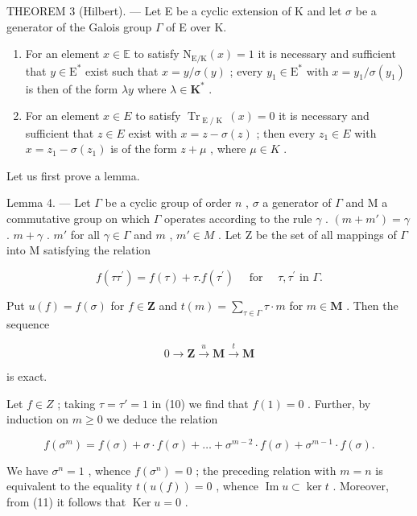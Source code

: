 THEOREM 3 (Hilbert). --- Let E be a cyclic extension of K and let \(\sigma\) be a generator of the Galois group \(\Gamma\) of E over K.

\begin{enumerate}
\def\labelenumi{\alph{enumi})}
\item
  For an element \(x \in \mathbb{E}\) to satisfy \(\mathrm{N}_{\mathrm{E} / \mathrm{K}}(x) = 1\) it is necessary and sufficient that \(y \in \mathrm{E}^*\) exist such that \(x = y / \sigma(y)\) ; every \(y_1 \in \mathrm{E}^*\) with \(x = y_1 / \sigma(y_1)\) is then of the form \(\lambda y\) where \(\lambda \in \mathbf{K}^*\) .
\item
  For an element \(x \in E\) to satisfy \(\operatorname{Tr}_{\operatorname{E}/\operatorname{K}}(x) = 0\) it is necessary and sufficient that \(z \in E\) exist with \(x = z - \sigma(z)\) ; then every \(z_{1} \in E\) with \(x = z_{1} - \sigma(z_{1})\) is of the form \(z + \mu\) , where \(\mu \in K\) .
\end{enumerate}

Let us first prove a lemma.

Lemma 4. --- Let \(\Gamma\) be a cyclic group of order \(n\) , \(\sigma\) a generator of \(\Gamma\) and M a commutative group on which \(\Gamma\) operates according to the rule \(\gamma\) . \((m + m') = \gamma\) . \(m + \gamma\) . \(m'\) for all \(\gamma \in \Gamma\) and \(m\) , \(m' \in M\) . Let Z be the set of all mappings of \(\Gamma\) into M satisfying the relation

\[
f \left(\tau \tau^ {\prime}\right) = f (\tau) + \tau . f \left(\tau^ {\prime}\right) \quad \text { for } \quad \tau , \tau^ {\prime} \text { in } \Gamma .\tag{10}
\]

Put \(u(f) = f(\sigma)\) for \(f \in \mathbf{Z}\) and \(t(m) = \sum_{\tau \in \Gamma} \tau \cdot m\) for \(m \in \mathbf{M}\) . Then the sequence

\[
0 \to \mathbf {Z} \xrightarrow {u} \mathbf {M} \xrightarrow {t} \mathbf {M}
\]

is exact.

Let \(f \in Z\) ; taking \(\tau = \tau' = 1\) in (10) we find that \(f(1) = 0\) . Further, by induction on \(m \geqslant 0\) we deduce the relation

\[
f (\sigma^ {m}) = f (\sigma) + \sigma \cdot f (\sigma) + \dots + \sigma^ {m - 2} \cdot f (\sigma) + \sigma^ {m - 1} \cdot f (\sigma).\tag{11}
\]

We have \(\sigma^n = 1\) , whence \(f(\sigma^n) = 0\) ; the preceding relation with \(m = n\) is equivalent to the equality \(t(u(f)) = 0\) , whence \(\operatorname{Im} u \subset \ker t\) . Moreover, from (11) it follows that \(\operatorname{Ker} u = 0\) .

